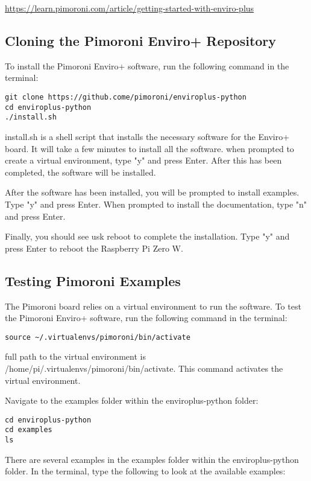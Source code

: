\documentclass{article}
\begin{document}
\url{https://learn.pimoroni.com/article/getting-started-with-enviro-plus}

\subsection{Cloning the Pimoroni Enviro+ Repository}

To install the Pimoroni Enviro+ software, run the following command in the terminal:

\begin{verbatim}
git clone https://github.come/pimoroni/enviroplus-python
cd enviroplus-python
./install.sh
\end{verbatim}

install.sh is a shell script that installs the necessary software for the Enviro+ board. It will take a few minutes to install all the software. when prompted to create a virtual environment, type "y" and press Enter. After this has been completed, the software will be installed. 

After the software has been installed, you will be prompted to install examples. Type "y" and press Enter.
When prompted to install the documentation, type "n" and press Enter. 

Finally, you should see usk reboot to complete the installation. Type "y" and press Enter to reboot the Raspberry Pi Zero W.

\subsection{Testing Pimoroni Examples}

The Pimoroni board relies on a virtual environment to run the software. To test the Pimoroni Enviro+ software, run the following command in the terminal:

\begin{verbatim}
source ~/.virtualenvs/pimoroni/bin/activate
\end{verbatim}

full path to the virtual environment is /home/pi/.virtualenvs/pimoroni/bin/activate. This command activates the virtual environment.

Navigate to the examples folder within the enviroplus-python folder:

\begin{verbatim}
cd enviroplus-python
cd examples
ls
\end{verbatim}

There are several examples in the examples folder within the enviroplus-python folder. In the terminal, type the following to look at the available examples:
\end{document}
